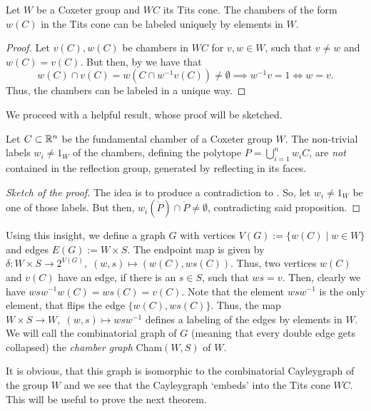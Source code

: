 \begin{lemma}
    Let \(W\) be a Coxeter group and \(WC\) its Tits cone.
    The chambers of the form \(w(C)\) in the Tits cone can be labeled uniquely by elements in \(W\).
\end{lemma}
\begin{proof}
    Let \(v(C), w(C)\) be chambers in \(WC\) for \(v, w \in W\), such that \(v \neq w\) and \(w(C) = v(C)\).\newline
    But then, by  we have that
    \[w(C) \cap v(C) = w(C \cap w^{-1}v(C)) \neq \emptyset \implies w^{-1}v = 1 \iff w = v.\]
    Thus, the chambers can be labeled in a unique way.
\end{proof}

We proceed with a helpful result, whose proof will be sketched.

\begin{lemma}
    Let \(C \subset \mathbb{R}^n\) be the fundamental chamber of a Coxeter group \(W\).
    The non-trivial labels \(w_i \neq 1_W\) of the chambers, defining the polytope \(P = \bigcup_{i=1}^n w_i C\), are \emph{not} contained in the reflection group, generated by reflecting in its faces.
\end{lemma}
\begin{proof}[Sketch of the proof]
    The idea is to produce a contradiction to . \newline
    So, let \(w_i \neq 1_W\) be one of those labels.
    But then, \(w_i(\mathring{P}) \cap \mathring{P} \neq \emptyset\), contradicting said proposition.
\end{proof}

Using this insight, we define a graph \(G\) with vertices \(V(G) := \{w(C) \;\vert\; w \in W\}\) and edges \(E(G) := W \times S\).
The endpoint map is given by \(\delta : W \times S \to 2^{V(G)},\; (w, s) \mapsto (w(C), ws(C))\).
Thus, two vertices \(w(C)\) and \(v(C)\) have an edge, if there is an \(s \in S\), such that \(ws = v\).
Then, clearly we have \(wsw^{-1}w(C) = ws(C) = v(C)\).
Note that the element \(wsw^{-1}\) is the only element, that flips the edge \(\{w(C), ws(C)\}\).
Thus, the map \(W \times S \to W, \; (w, s) \mapsto wsw^{-1}\) defines a labeling of the edges by elements in \(W\).
We will call the combinatorial graph of \(G\) (meaning that every double edge gets collapsed) the \emph{chamber graph} Cham\((W, S)\) of \(W\).

It is obvious, that this graph is isomorphic to the combinatorial Cayleygraph of the group \(W\) and we see that the Cayleygraph `embeds' into the Tits cone \(WC\).
This will be useful to prove the next theorem.

